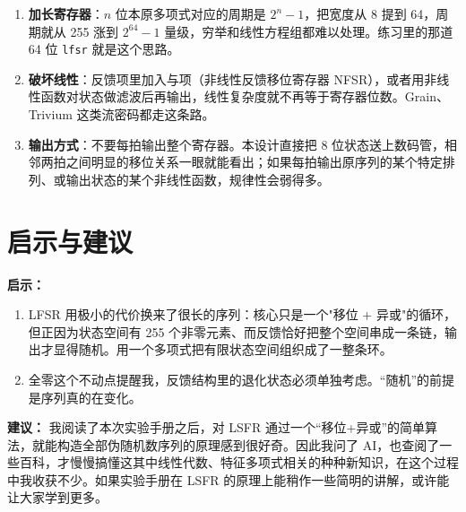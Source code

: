 \documentclass[12pt, a4paper]{ctexart}
\begin{document}
\begin{enumerate}
    \item \textbf{加长寄存器}：$n$ 位本原多项式对应的周期是 $2^n-1$，把宽度从 8 提到 64，周期就从 255 涨到 $2^{64}-1$ 量级，穷举和线性方程组都难以处理。练习里的那道 64 位 \texttt{lfsr} 就是这个思路。
    \item \textbf{破坏线性}：反馈项里加入与项（非线性反馈移位寄存器 NFSR），或者用非线性函数对状态做滤波后再输出，线性复杂度就不再等于寄存器位数。Grain、Trivium 这类流密码都走这条路。
    \item \textbf{输出方式}：不要每拍输出整个寄存器。本设计直接把 8 位状态送上数码管，相邻两拍之间明显的移位关系一眼就能看出；如果每拍输出原序列的某个特定排列、或输出状态的某个非线性函数，规律性会弱得多。
\end{enumerate}

\section{启示与建议}

\textbf{启示：}

\begin{enumerate}
    \item LFSR 用极小的代价换来了很长的序列：核心只是一个"移位 + 异或"的循环，但正因为状态空间有 255 个非零元素、而反馈恰好把整个空间串成一条链，输出才显得随机。用一个多项式把有限状态空间组织成了一整条环。
    \item 全零这个不动点提醒我，反馈结构里的退化状态必须单独考虑。“随机”的前提是序列真的在变化。
\end{enumerate}

\textbf{建议：} 我阅读了本次实验手册之后，对 LSFR 通过一个“移位+异或”的简单算法，就能构造全部伪随机数序列的原理感到很好奇。因此我问了 AI，也查阅了一些百科，才慢慢搞懂这其中线性代数、特征多项式相关的种种新知识，在这个过程中我收获不少。如果实验手册在 LSFR 的原理上能稍作一些简明的讲解，或许能让大家学到更多。
\end{document}
